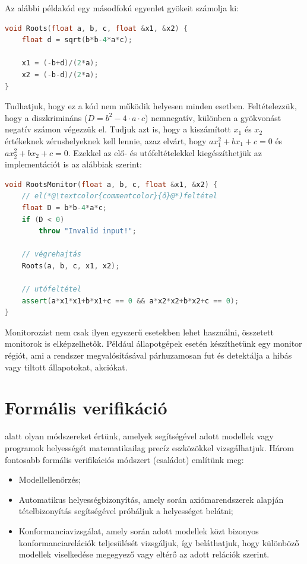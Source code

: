 \begin{pelda}
Az alábbi példakód egy másodfokú egyenlet gyökeit számolja ki:

\begin{lstlisting}[language=C++]
void Roots(float a, b, c, float &x1, &x2) {
    float d = sqrt(b*b-4*a*c);

    x1 = (-b+d)/(2*a);
    x2 = (-b-d)/(2*a);
}
\end{lstlisting}

Tudhatjuk, hogy ez a kód nem működik helyesen minden esetben. Feltételezzük, hogy a diszkrimináns ($D=b^2-4\cdot a\cdot c$) nemnegatív, különben a gyökvonást negatív számon végezzük el. Tudjuk azt is, hogy a kiszámított $x_1$ és $x_2$ értékeknek zérushelyeknek kell lennie, azaz elvárt, hogy $ax_1^2 + bx_1 + c = 0$ és $ax_2^2 + bx_2 + c = 0$. Ezekkel az elő- és utófeltételekkel kiegészíthetjük az implementációt is az alábbiak szerint:


\begin{lstlisting}[language=C++,morekeywords={assert}]
void RootsMonitor(float a, b, c, float &x1, &x2) {
    // el(*@\textcolor{commentcolor}{ő}@*)feltétel
    float D = b*b-4*a*c;
    if (D < 0)
        throw "Invalid input!";

    // végrehajtás
    Roots(a, b, c, x1, x2);

    // utófeltétel
    assert(a*x1*x1+b*x1+c == 0 && a*x2*x2+b*x2+c == 0);
}
\end{lstlisting}
\end{pelda}

Monitorozást nem csak ilyen egyszerű esetekben lehet használni, összetett monitorok is elképzelhetők. Például állapotgépek esetén készíthetünk egy monitor régiót, ami a rendszer megvalósításával párhuzamosan fut és detektálja a hibás vagy tiltott állapotokat, akciókat.







\section{Formális verifikáció\kiegeszitoanyag}\label{sec:formalis-verifikacio}
 alatt olyan módszereket értünk, amelyek segítségével adott modellek vagy programok helyességét matematikailag precíz eszközökkel vizsgálhatjuk. Három fontosabb formális verifikációs módszert (családot) említünk meg:
\begin{itemize}
\item Modellellenőrzés;
\item Automatikus helyességbizonyítás, amely során axiómarendszerek alapján tételbizonyítás segítségével próbáljuk a helyességet belátni;
\item Konformanciavizsgálat, amely során adott modellek közt bizonyos konformanciarelációk teljesülését vizsgáljuk, így beláthatjuk, hogy különböző modellek viselkedése megegyező vagy eltérő az adott relációk szerint.
\end{itemize}

